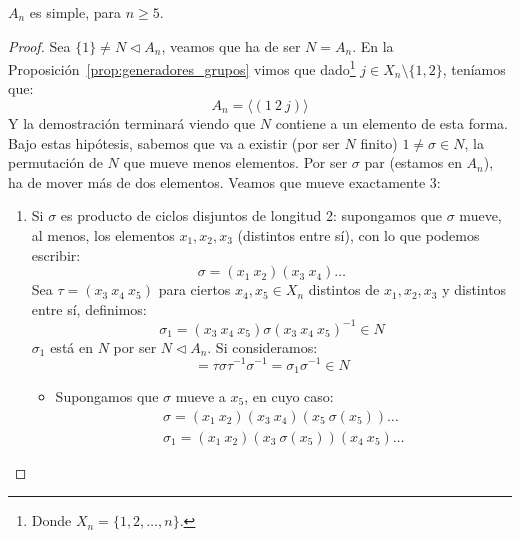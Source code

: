 \begin{teo}[de Abel]
    $A_n$ es simple, para $n\geq 5$.
    \begin{proof} 
        Sea $\{1\} \neq N \lhd A_n$, veamos que ha de ser $N = A_n$. En la Proposición~\ref{prop:generadores_grupos} vimos que dado\footnote{Donde $X_n = \{1,2,\ldots,n\}.$} $j \in X_n\setminus \{1,2\}$, teníamos que:
        \begin{equation*}
            A_n = \langle (1\ 2\ j) \rangle 
        \end{equation*}
        Y la demostración terminará viendo que $N$ contiene a un elemento de esta forma. Bajo estas hipótesis, sabemos que va a existir (por ser $N$ finito) $1\neq \sigma\in N$, la permutación de $N$ que mueve menos elementos. Por ser $\sigma$ par (estamos en $A_n$), ha de mover más de dos elementos. Veamos que mueve exactamente 3:
        \begin{enumerate}
            \item Si $\sigma$ es producto de ciclos disjuntos de longitud 2: supongamos que $\sigma$ mueve, al menos, los elementos $x_1,x_2,x_3$ (distintos entre sí), con lo que podemos escribir:
                \begin{equation*}
                    \sigma = (x_1\ x_2)(x_3\ x_4) \ldots
                \end{equation*}
                Sea $\tau = (x_3\ x_4\ x_5)$ para ciertos $x_4,x_5\in X_n$ distintos de $x_1,x_2,x_3$ y distintos entre sí, definimos:
                \begin{equation*}
                    \sigma_1 = (x_3\ x_4\ x_5)\sigma {(x_3\ x_4\ x_5)}^{-1}\in  N
                \end{equation*}
                $\sigma_1$ está en $N$ por ser $N\lhd A_n$. Si consideramos:
                \begin{equation*}
                    [\tau, \sigma] = \tau \sigma \tau^{-1} \sigma^{-1} = \sigma_1 \sigma^{-1} \in N
                \end{equation*}
                \begin{itemize}
                    \item Supongamos que $\sigma$ mueve a $x_5$, en cuyo caso:
                        \begin{gather*}
                            \sigma = (x_1\ x_2)(x_3\ x_4)(x_5\ \sigma(x_5))\ldots \\
                            \sigma_1 = (x_1\ x_2)(x_3\ \sigma(x_5))(x_4\ x_5)\ldots
                        \end{gather*}

\end{itemize}
\end{enumerate}
\end{proof}
\end{teo}
